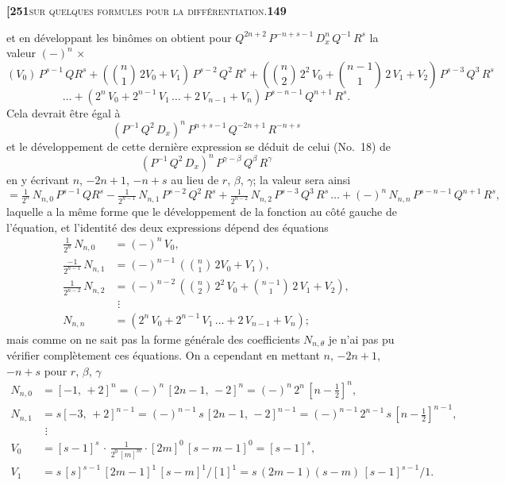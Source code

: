 \documentclass[11pt]{article}
\begin{document}
\newpage

\noindent\textbf{[251}\hfill\textsc{sur quelques formules pour la différentiation.}\hfill\textbf{149}

\medskip

\noindent et en développant les binômes on obtient pour $Q^{2n+2}\,P^{-n+s-1}\,D_x^n\,Q^{-1}\,R^s$ la valeur $(-)^n\,\times$
\[
(V_0)\,P^{s-1}\,QR^s + \left(\binom{n}{1}\,2V_0 + V_1\right)\,P^{s-2}\,Q^2\,R^s + \left(\binom{n}{2}\,2^2\,V_0 + \binom{n-1}{1}\,2\,V_1 + V_2\right)\,P^{s-3}\,Q^3\,R^s
\]
\[
\ldots + (2^n\,V_0 + 2^{n-1}\,V_1\,\ldots + 2\,V_{n-1} + V_n)\,P^{s-n-1}\,Q^{n+1}\,R^s.
\]
Cela devrait être égal à
\[
(P^{-1}\,Q^2\,D_x)^n\,P^{n+s-1}\,Q^{-2n+1}\,R^{-n+s}
\]
et le développement de cette dernière expression se déduit de celui (No.~18) de
\[
(P^{-1}\,Q^2\,D_x)^n\,P^{\gamma-\beta}\,Q^{\beta}\,R^{\gamma}
\]
en y écrivant $n$, $-2n + 1$, $-n + s$ au lieu de $r$, $\beta$, $\gamma$; la valeur sera ainsi
\[
= \tfrac{1}{2^n}\,N_{n,0}\,P^{s-1}\,QR^s - \tfrac{1}{2^{n-1}}\,N_{n,1}\,P^{s-2}\,Q^2\,R^s + \tfrac{1}{2^{n-2}}\,N_{n,2}\,P^{s-3}\,Q^3\,R^s\,\ldots + (-)^n\,N_{n,n}\,P^{s-n-1}\,Q^{n+1}\,R^s,
\]
laquelle a la même forme que le développement de la fonction au côté gauche de l'équation, et l'identité des deux expressions dépend des équations
\begin{align*}
\tfrac{1}{2^n}\,N_{n,0} &= (-)^n\,V_0,\\
\tfrac{-1}{2^{n-1}}\,N_{n,1} &= (-)^{n-1}\,\left(\binom{n}{1}\,2V_0 + V_1\right),\\
\tfrac{1}{2^{n-2}}\,N_{n,2} &= (-)^{n-2}\,\left(\binom{n}{2}\,2^2\,V_0 + \binom{n-1}{1}\,2\,V_1 + V_2\right),\\
&\,\,\vdots\\
N_{n,n} &= (2^n\,V_0 + 2^{n-1}\,V_1\,\ldots + 2\,V_{n-1} + V_n);
\end{align*}
mais comme on ne sait pas la forme générale des coefficients $N_{n,\theta}$ je n'ai pas pu vérifier complètement ces équations. On a cependant en mettant $n$, $-2n + 1$, $-n + s$ pour $r$, $\beta$, $\gamma$
\begin{align*}
N_{n,0} &= [-1,\,+2]^{n} = (-)^{n}\,[2n - 1,\,-2]^{n} = (-)^{n}\,2^{n}\,[n - \tfrac{1}{2}]^{n},\\
N_{n,1} &= s[-3,\,+2]^{n-1} = (-)^{n-1}\,s\,[2n - 1,\,-2]^{n-1} = (-)^{n-1}\,2^{n-1}\,s\,[n - \tfrac{1}{2}]^{n-1},\\
&\,\,\vdots\\
V_0 &= [s - 1]^{s}\,\cdot\,\frac{1}{2^{0}\,[m]^{m}}\cdot[2m]^{0}\,[s - m - 1]^{0} = [s - 1]^{s},\\
V_1 &= s\,[s]^{s-1}\,[2m - 1]^{1}\,[s - m]^{1}/[1]^{1} = s\,(2m - 1)(s - m)\,[s - 1]^{s-1}/1.
\end{align*}
\end{document}
